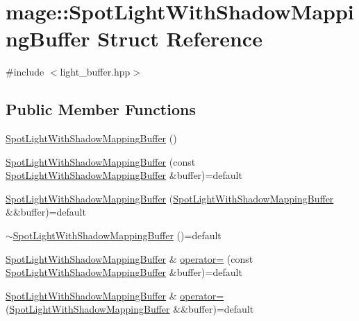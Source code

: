\hypertarget{structmage_1_1_spot_light_with_shadow_mapping_buffer}{}\section{mage\+:\+:Spot\+Light\+With\+Shadow\+Mapping\+Buffer Struct Reference}
\label{structmage_1_1_spot_light_with_shadow_mapping_buffer}


{\ttfamily \#include $<$light\+\_\+buffer.\+hpp$>$}

\subsection*{Public Member Functions}
\begin{DoxyCompactItemize}
\item 
\hyperlink{structmage_1_1_spot_light_with_shadow_mapping_buffer_a96d597bc25801b19e38d3eefa0d662f1}{Spot\+Light\+With\+Shadow\+Mapping\+Buffer} ()
\item 
\hyperlink{structmage_1_1_spot_light_with_shadow_mapping_buffer_aa9078fd9b347d633b48fb8bbb330d54e}{Spot\+Light\+With\+Shadow\+Mapping\+Buffer} (const \hyperlink{structmage_1_1_spot_light_with_shadow_mapping_buffer}{Spot\+Light\+With\+Shadow\+Mapping\+Buffer} \&buffer)=default
\item 
\hyperlink{structmage_1_1_spot_light_with_shadow_mapping_buffer_a933982cf023e052a21da2009f48d9ae1}{Spot\+Light\+With\+Shadow\+Mapping\+Buffer} (\hyperlink{structmage_1_1_spot_light_with_shadow_mapping_buffer}{Spot\+Light\+With\+Shadow\+Mapping\+Buffer} \&\&buffer)=default
\item 
\hyperlink{structmage_1_1_spot_light_with_shadow_mapping_buffer_ae96fbec68878382084dce0147da2eb72}{$\sim$\+Spot\+Light\+With\+Shadow\+Mapping\+Buffer} ()=default
\item 
\hyperlink{structmage_1_1_spot_light_with_shadow_mapping_buffer}{Spot\+Light\+With\+Shadow\+Mapping\+Buffer} \& \hyperlink{structmage_1_1_spot_light_with_shadow_mapping_buffer_ad22e5a39ca0f4f313de923876c02b2ac}{operator=} (const \hyperlink{structmage_1_1_spot_light_with_shadow_mapping_buffer}{Spot\+Light\+With\+Shadow\+Mapping\+Buffer} \&buffer)=default
\item 
\hyperlink{structmage_1_1_spot_light_with_shadow_mapping_buffer}{Spot\+Light\+With\+Shadow\+Mapping\+Buffer} \& \hyperlink{structmage_1_1_spot_light_with_shadow_mapping_buffer_abb7324a9b98123e701b1e61cc7720cf9}{operator=} (\hyperlink{structmage_1_1_spot_light_with_shadow_mapping_buffer}{Spot\+Light\+With\+Shadow\+Mapping\+Buffer} \&\&buffer)=default
\end{DoxyCompactItemize}
